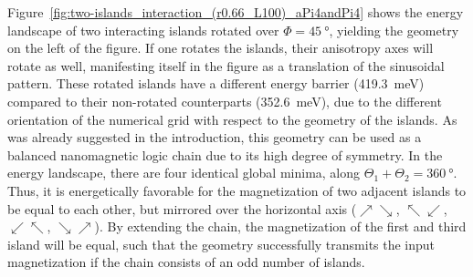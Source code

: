 \documentclass[11pt,a4paper,english,twoside]{article}
\begin{document}
Figure~\ref{fig:two-islands_interaction_(r0.66_L100)_aPi4andPi4} shows the energy landscape of two interacting islands rotated over $\Phi=\SI{45}{\degree}$, yielding the geometry on the left of the figure. If one rotates the islands, their anisotropy axes will rotate as well, manifesting itself in the figure as a translation of the sinusoidal pattern. These rotated islands have a different energy barrier (\SI{419.3}{\milli\electronvolt}) compared to their non-rotated counterparts (\SI{352.6}{\milli\electronvolt}), due to the different orientation of the numerical grid with respect to the geometry of the islands. As was already suggested in the introduction, this geometry can be used as a balanced nanomagnetic logic chain due to its high degree of symmetry. In the energy landscape, there are four identical global minima, along $\Theta_1 + \Theta_2 = \SI{360}{\degree}$. Thus, it is energetically favorable for the magnetization of two adjacent islands to be equal to each other, but mirrored over the horizontal axis ($\nearrow \searrow$, $\nwarrow \swarrow$, $\swarrow \nwarrow$, $\searrow \nearrow$). By extending the chain, the magnetization of the first and third island will be equal, such that the geometry successfully transmits the input magnetization if the chain consists of an odd number of islands. 
\end{document}
